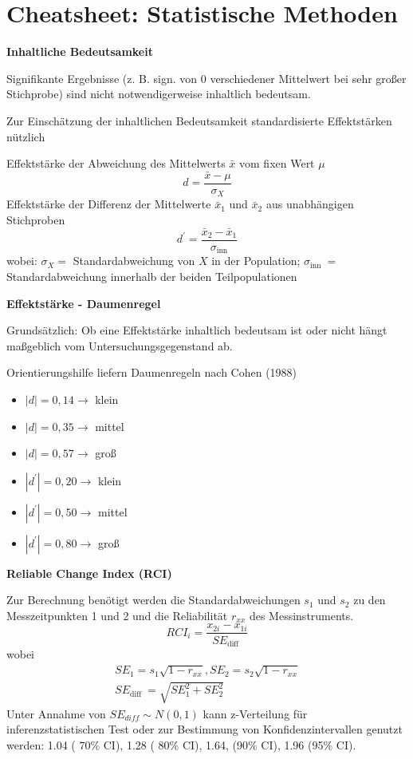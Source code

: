 \documentclass[10pt, letterpaper]{article}
\begin{document}
\section*{Cheatsheet: Statistische Methoden}

\textbf{Inhaltliche Bedeutsamkeit}


Signifikante Ergebnisse (z. B. sign. von 0 verschiedener Mittelwert bei sehr großer Stichprobe) sind nicht notwendigerweise inhaltlich bedeutsam.

Zur Einschätzung der inhaltlichen Bedeutsamkeit standardisierte Effektstärken nützlich

Effektstärke der Abweichung des Mittelwerts $\bar{x}$ vom fixen Wert $\mu$
$$
d=\frac{\bar{x}-\mu}{\sigma_X}
$$
Effektstärke der Differenz der Mittelwerte $\bar{x}_1$ und $\bar{x}_2$ aus unabhängigen Stichproben
$$
d^{\prime}=\frac{\bar{x}_2-\bar{x}_1}{\sigma_{\mathrm{inn}}}
$$
wobei: $\sigma_X=$ Standardabweichung von $X$ in der Population; $\sigma_{\text {inn }}=$ Standardabweichung innerhalb der beiden Teilpopulationen

\vspace{0.4cm}

\textbf{Effektstärke - Daumenregel}

Grundsätzlich: Ob eine Effektstärke inhaltlich bedeutsam ist oder nicht hängt maßgeblich vom Untersuchungsgegenstand ab.

Orientierungshilfe liefern Daumenregeln nach Cohen (1988)

\begin{itemize}
    \item  $|d|=0,14 \rightarrow$ klein

\item $|d|=0,35 \rightarrow$ mittel

\item $|d|=0,57 \rightarrow$ groß

\item $\left|d^{\prime}\right|=0,20 \rightarrow$ klein

\item $\left|d^{\prime}\right|=0,50 \rightarrow$ mittel

\item $\left|d^{\prime}\right|=0,80 \rightarrow$ groß
\end{itemize}
\vspace{0.4cm}

\textbf{Reliable Change Index (RCI)}

Zur Berechnung benötigt werden die Standardabweichungen $s_1$ und $s_2$ zu den Messzeitpunkten 1 und 2 und die Reliabilität $r_{x x}$ des Messinstruments.
$$
R C I_i=\frac{x_{2 i}-x_{1 i}}{S E_{\text {diff }}}
$$
wobei
$$
\begin{gathered}
S E_1=s_1 \sqrt{1-r_{x x}}, S E_2=s_2 \sqrt{1-r_{x x}} \\
S E_{\text {diff }}=\sqrt{S E_1^2+S E_2^2}
\end{gathered}
$$
Unter Annahme von $S E_{d i f f} \sim N(0,1)$ kann z-Verteilung für inferenzstatistischen Test oder zur Bestimmung von Konfidenzintervallen genutzt werden: 1.04 ( $70 \%$ CI), 1.28 ( $80 \%$ CI), 1.64, (90\% CI), 1.96 (95\% CI).
\vspace{0.4cm}
\end{document}

